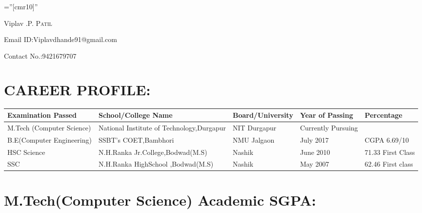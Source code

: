 \documentclass[a4paper,10pt]{article}
\begin{document}
\pagestyle{empty} %

\font\fb=''[cmr10]'' %

\par{\centering
		{\Huge Viplav .P. \textsc{Patil}
	}\bigskip\par}


{\Large Email ID:Viplavdhande91@gmail.com}

\par	
{\Large Contact No.:9421679707}

 

\section{}


\section{CAREER PROFILE:}

\begin{center}
\begin{tabular}{ | m{5.5em} | m{3.5cm}| m{3.5cm} | m{3cm} | m{3cm} | } 
\hline
\textbf{Examination Passed} & \textbf{School/College Name}  & \textbf{Board/University}  & \textbf{Year of Passing}  & \textbf{Percentage }  \\ 
\hline
M.Tech (Computer Science)  & National Institute of Technology,Durgapur & NIT Durgapur & Currently Pursuing & \\


\hline
B.E(Computer Engineering) & SSBT’s COET,Bambhori  & NMU Jalgaon  & July 2017  & CGPA 6.69/10 \\

\hline
HSC Science  & N.H.Ranka Jr.College,Bodwad(M.S) & Nashik & June 2010 & 71.33 First Class \\

\hline
SSC & N.H.Ranka HighSchool ,Bodwad(M.S) & Nashik & May 2007 & 62.46 First class \\ 
\hline
\end{tabular}
\end{center}



\vspace{15mm}


\section{M.Tech(Computer Science) Academic SGPA:}
\end{document}
